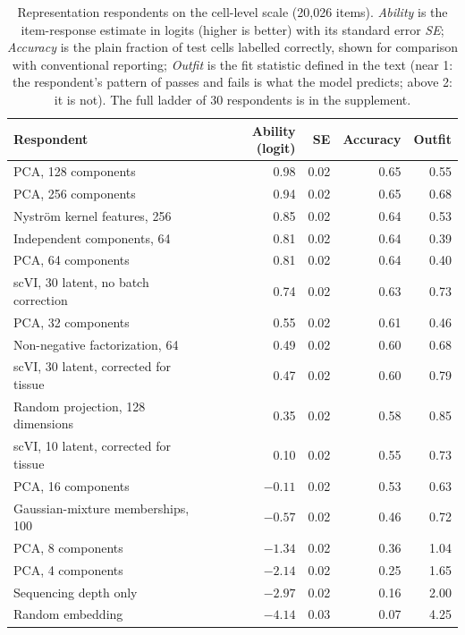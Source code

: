 \documentclass[11pt]{article}
\begin{document}
\begin{table}[t]
\centering
\small
\caption{Representation respondents on the cell-level scale (20,026 items). \emph{Ability}
is the item-response estimate in logits (higher is better) with its standard error
\emph{SE}; \emph{Accuracy} is the plain fraction of test cells labelled correctly, shown
for comparison with conventional reporting; \emph{Outfit} is the fit statistic defined in
the text (near 1: the respondent's pattern of passes and fails is what the model
predicts; above 2: it is not). The full ladder of 30 respondents is in the supplement.}
\label{tab:abilA}
\begin{tabular}{@{}lrrrr@{}}
\toprule
Respondent & Ability (logit) & SE & Accuracy & Outfit \\
\midrule
PCA, 128 components & 0.98 & 0.02 & 0.65 & 0.55 \\
PCA, 256 components & 0.94 & 0.02 & 0.65 & 0.68 \\
Nystr\"om kernel features, 256 & 0.85 & 0.02 & 0.64 & 0.53 \\
Independent components, 64 & 0.81 & 0.02 & 0.64 & 0.39 \\
PCA, 64 components & 0.81 & 0.02 & 0.64 & 0.40 \\
scVI, 30 latent, no batch correction & 0.74 & 0.02 & 0.63 & 0.73 \\
PCA, 32 components & 0.55 & 0.02 & 0.61 & 0.46 \\
Non-negative factorization, 64 & 0.49 & 0.02 & 0.60 & 0.68 \\
scVI, 30 latent, corrected for tissue & 0.47 & 0.02 & 0.60 & 0.79 \\
Random projection, 128 dimensions & 0.35 & 0.02 & 0.58 & 0.85 \\
scVI, 10 latent, corrected for tissue & 0.10 & 0.02 & 0.55 & 0.73 \\
PCA, 16 components & $-0.11$ & 0.02 & 0.53 & 0.63 \\
Gaussian-mixture memberships, 100 & $-0.57$ & 0.02 & 0.46 & 0.72 \\
PCA, 8 components & $-1.34$ & 0.02 & 0.36 & 1.04 \\
PCA, 4 components & $-2.14$ & 0.02 & 0.25 & 1.65 \\
Sequencing depth only & $-2.97$ & 0.02 & 0.16 & 2.00 \\
Random embedding & $-4.14$ & 0.03 & 0.07 & 4.25 \\
\bottomrule
\end{tabular}
\end{table}
\end{document}
